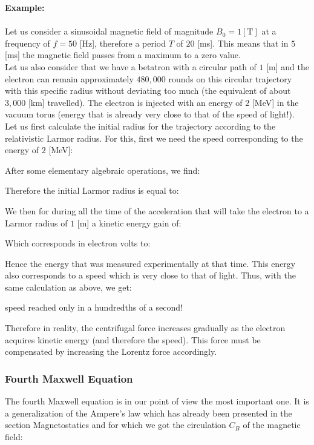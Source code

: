 	\begin{tcolorbox}[colframe=black,colback=white,sharp corners]
	\textbf{{\Large {}}Example:}\\\\
	Let us consider a sinusoidal magnetic field of magnitude $B_0=1 [\text{T}]$ at a frequency of $f=50$ [Hz], therefore a period $T$ of $20$ [ms]. This means that in $5$ [ms] the magnetic field passes from a maximum to a zero value.\\

	Let us also consider that we have a betatron with a circular path of $1$ [m] and the electron can remain approximately $480,000$ rounds on this circular trajectory with this specific radius without deviating too much (the equivalent of about $3,000$ [km] travelled). The electron is injected with an energy of $2$ [MeV] in the vacuum torus (energy that is already very close to that of the speed of light!).\\
	
	Let us first calculate the initial radius for the trajectory according to the relativistic Larmor radius. For this, first we need the speed corresponding to the energy of $2$ [MeV]:
	
	After some elementary algebraic operations, we find:
	
	Therefore the initial Larmor radius is equal to:
	
	We then for during all the time of the acceleration that will take the electron to a Larmor radius of $1$ [m] a kinetic energy gain of:
	
	Which corresponds in electron volts to:
	
	Hence the energy that was measured experimentally at that time. This energy also corresponds to a speed which is very close to that of light. Thus, with the same calculation as above, we get:
	
	speed reached only in a hundredths of a second!
	\end{tcolorbox}
	\begin{tcolorbox}[title=Remark,colframe=black,arc=10pt]
	Therefore in reality, the centrifugal force increases gradually as the electron acquires kinetic energy (and therefore the speed). This force must be compensated by increasing the Lorentz force accordingly.
	\end{tcolorbox}
	
	\subsubsection{Fourth Maxwell Equation}\label{fourth maxwell equation}
	The fourth Maxwell equation is in our point of view the most important one. It is a generalization of the Ampere's law which has already been presented in the section Magnetostatics and for which we got the circulation $C_B$ of the magnetic field:
	
